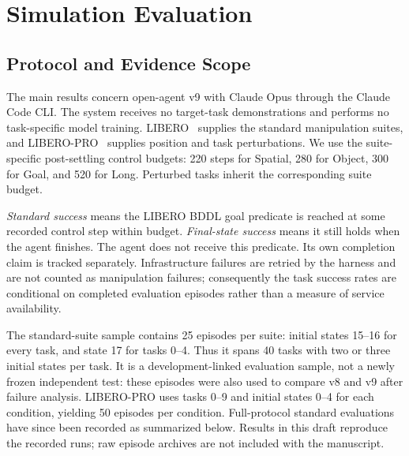 \section{Simulation Evaluation}
\label{sec:eval}

\subsection{Protocol and Evidence Scope}
The main results concern open-agent v9 with Claude Opus through the Claude Code CLI. The system receives no target-task demonstrations and performs no task-specific model training. LIBERO~\citep{liu2023libero} supplies the standard manipulation suites, and LIBERO-PRO~\citep{zhou2025liberopro} supplies position and task perturbations. We use the suite-specific post-settling control budgets: 220 steps for Spatial, 280 for Object, 300 for Goal, and 520 for Long. Perturbed tasks inherit the corresponding suite budget.

\emph{Standard success} means the LIBERO BDDL goal predicate is reached at some recorded control step within budget. \emph{Final-state success} means it still holds when the agent finishes. The agent does not receive this predicate. Its own completion claim is tracked separately. Infrastructure failures are retried by the harness and are not counted as manipulation failures; consequently the task success rates are conditional on completed evaluation episodes rather than a measure of service availability.

The standard-suite sample contains 25 episodes per suite: initial states 15--16 for every task, and state 17 for tasks 0--4. Thus it spans 40 tasks with two or three initial states per task. It is a development-linked evaluation sample, not a newly frozen independent test: these episodes were also used to compare v8 and v9 after failure analysis. LIBERO-PRO uses tasks 0--9 and initial states 0--4 for each condition, yielding 50 episodes per condition. Full-protocol standard evaluations have since been recorded as summarized below. Results in this draft reproduce the recorded runs; raw episode archives are not included with the manuscript.

